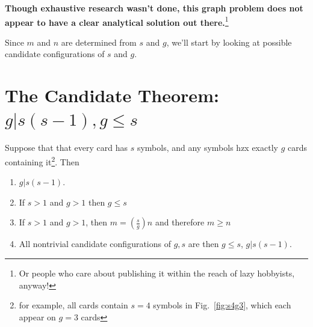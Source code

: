 \documentclass[11pt, oneside]{article} 	%
\begin{document}
\textbf{Though exhaustive research wasn't done, this graph problem does not appear to have a clear analytical solution out there.}\footnote{Or people who care about publishing it within the reach of lazy hobbyists, anyway!}

Since $m$ and $n$ are determined from $s$ and $g$, we'll start by looking at possible candidate configurations of $s$ and $g$.

\section{The Candidate Theorem: $g | s(s-1), g \leq s$}

Suppose that that every card has $s$ symbols, and any symbols hzx exactly $g$ cards containing it\footnote{for example, all cards contain $s=4$ symbols in Fig.~\ref{fig:s4g3}, which each appear on $g=3$ cards}. Then 

\begin{framed}
\begin{enumerate}
\item $g | s(s-1)$.
\item If $s >1 $ and $g > 1$ then $g \leq s$ 
\item If $s >1 $ and $g > 1$, then $m = (\frac{s}{g})n$ and therefore $m \geq n$
\item All nontrivial candidate configurations of $g, s$ are then $g \leq s$, $g | s(s-1)$.
\end{enumerate}
\end{framed}
\end{document}
